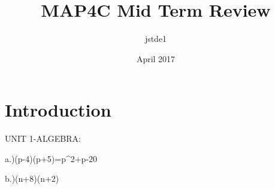 \documentclass{article}
\title{MAP4C Mid Term Review}
\author{jstde1 }
\date{April 2017}
\begin{document}
\maketitle

\section{Introduction}
UNIT 1-ALGEBRA:

a.)(p-4)(p+5)=p^2+p-20

b.)(n+8)(n+2)
\end{document}
